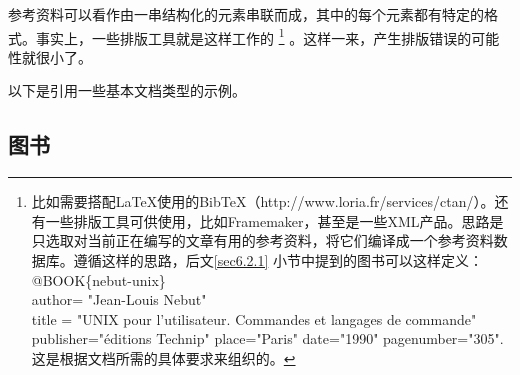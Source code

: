 参考资料可以看作由一串结构化的元素串联而成，其中的每个元素都有特定的格式。事实上，一些排版工具就是这样工作的
    \footnote{比如需要搭配\LaTeX 使用的Bib\TeX（http://www.loria.fr/services/ctan/）。还有一些排版工具可供使用，比如Framemaker，甚至是一些XML产品。思路是只选取对当前正在编写的文章有用的参考资料，将它们编译成一个参考资料数据库。遵循这样的思路，后文\ref{sec6.2.1}%
    小节中提到的图书可以这样定义：\\
    {\ttfamily 
    @BOOK\{nebut-unix\}\\
    author= "Jean-Louis Nebut"\\
    title = "UNIX pour l'utilisateur. Commandes et langages de commande"\\
    publisher="éditions Technip" place="Paris" date="1990" pagenumber="305".\\
    }
    这是根据文档所需的具体要求来组织的。}
。这样一来，产生排版错误的可能性就很小了。

以下是引用一些基本文档类型的示例。

\subsection{图书}